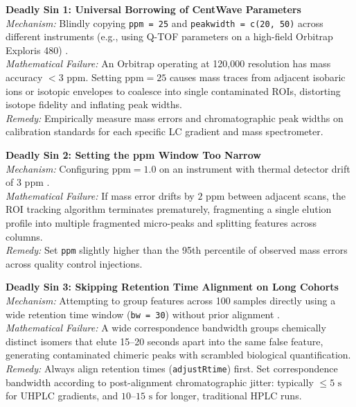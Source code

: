 \documentclass[11pt,twoside,openright]{book}
\begin{document}
\begin{pitfallbox}
\textbf{Deadly Sin 1: Universal Borrowing of CentWave Parameters}\\
\textit{Mechanism:} Blindly copying \texttt{ppm = 25} and \texttt{peakwidth = c(20, 50)} across different instruments (e.g., using Q-TOF parameters on a high-field Orbitrap Exploris 480) \cite{tautenhahn2008highly}.\\
\textit{Mathematical Failure:} An Orbitrap operating at 120,000 resolution has mass accuracy $< 3\text{ ppm}$. Setting $\text{ppm} = 25$ causes mass traces from adjacent isobaric ions or isotopic envelopes to coalesce into single contaminated ROIs, distorting isotope fidelity and inflating peak widths.\\
\textit{Remedy:} Empirically measure mass errors and chromatographic peak widths on calibration standards for each specific LC gradient and mass spectrometer.
\end{pitfallbox}

\begin{pitfallbox}
\textbf{Deadly Sin 2: Setting the ppm Window Too Narrow}\\
\textit{Mechanism:} Configuring $\text{ppm} = 1.0$ on an instrument with thermal detector drift of $3\text{ ppm}$ \cite{mclean2021metabolomics}.\\
\textit{Mathematical Failure:} If mass error drifts by $2\text{ ppm}$ between adjacent scans, the ROI tracking algorithm terminates prematurely, fragmenting a single elution profile into multiple fragmented micro-peaks and splitting features across columns.\\
\textit{Remedy:} Set \texttt{ppm} slightly higher than the 95th percentile of observed mass errors across quality control injections.
\end{pitfallbox}

\begin{pitfallbox}
\textbf{Deadly Sin 3: Skipping Retention Time Alignment on Long Cohorts}\\
\textit{Mechanism:} Attempting to group features across 100 samples directly using a wide retention time window (\texttt{bw = 30}) without prior alignment \cite{mahieu2016warping}.\\
\textit{Mathematical Failure:} A wide correspondence bandwidth groups chemically distinct isomers that elute 15--20 seconds apart into the same false feature, generating contaminated chimeric peaks with scrambled biological quantification.\\
\textit{Remedy:} Always align retention times (\texttt{adjustRtime}) first. Set correspondence bandwidth according to post-alignment chromatographic jitter: typically $\le 5\text{ s}$ for UHPLC gradients, and $10$--$15\text{ s}$ for longer, traditional HPLC runs.
\end{pitfallbox}
\end{document}
